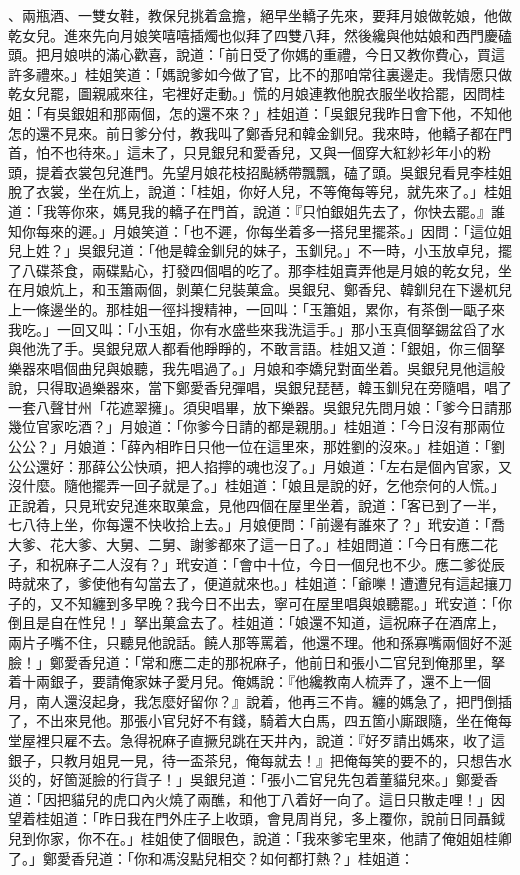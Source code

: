 \begin{showcontents}{}
、兩瓶酒、一雙女鞋，教保兒挑着盒擔，絕早坐轎子先來，要拜月娘做乾娘，他做乾女兒。進來先向月娘笑嘻嘻插燭也似拜了四雙八拜，然後纔與他姑娘和西門慶磕頭。把月娘哄的滿心歡喜，說道：「前日受了你媽的重禮，今日又教你費心，買這許多禮來。」桂姐笑道：「媽說爹如今做了官，比不的那咱常往裏邊走。我情愿只做乾女兒罷，圖親戚來往，宅裡好走動。」慌的月娘連教他脫衣服坐收拾罷，因問桂姐：「有吳銀姐和那兩個，怎的還不來？」桂姐道：「吳銀兒我昨日會下他，不知他怎的還不見來。前日爹分付，教我叫了鄭香兒和韓金釧兒。我來時，他轎子都在門首，怕不也待來。」這未了，只見銀兒和愛香兒，又與一個穿大紅紗衫年小的粉頭，提着衣裳包兒進門。先望月娘花枝招颭綉帶飄飄，磕了頭。吳銀兒看見李桂姐脫了衣裳，坐在炕上，說道：「桂姐，你好人兒，不等俺每等兒，就先來了。」桂姐道：「我等你來，媽見我的轎子在門首，說道：『只怕銀姐先去了，你快去罷。』誰知你每來的遲。」月娘笑道：「也不遲，你每坐着多一搭兒里擺茶。」因問：「這位姐兒上姓？」吳銀兒道：「他是韓金釧兒的妹子，玉釧兒。」不一時，小玉放卓兒，擺了八碟茶食，兩碟點心，打發四個唱的吃了。那李桂姐賣弄他是月娘的乾女兒，坐在月娘炕上，和玉簫兩個，剝菓仁兒裝菓盒。吳銀兒、鄭香兒、韓釧兒在下邊杌兒上一條邊坐的。那桂姐一徑抖搜精神，一回叫：「玉簫姐，累你，有茶倒一甌子來我吃。」一回又叫：「小玉姐，你有水盛些來我洗這手。」那小玉真個拏錫盆舀了水與他洗了手。吳銀兒眾人都看他睜睜的，不敢言語。桂姐又道：「銀姐，你三個拏樂器來唱個曲兒與娘聽，我先唱過了。」月娘和李嬌兒對面坐着。吳銀兒見他這般說，只得取過樂器來，當下鄭愛香兒彈唱，吳銀兒琵琶，韓玉釧兒在旁隨唱，唱了一套八聲甘州「花遮翠擁」。須臾唱畢，放下樂器。吳銀兒先問月娘：「爹今日請那幾位官家吃酒？」月娘道：「你爹今日請的都是親朋。」桂姐道：「今日沒有那兩位公公？」月娘道：「薛內相昨日只他一位在這里來，那姓劉的沒來。」桂姐道：「劉公公還好：那薛公公快頑，把人掐擰的魂也沒了。」月娘道：「左右是個內官家，又沒什麼。隨他擺弄一回子就是了。」桂姐道：「娘且是說的好，乞他奈何的人慌。」正說着，只見玳安兒進來取菓盒，見他四個在屋里坐着，說道：「客已到了一半，七八待上坐，你每還不快收拾上去。」月娘便問：「前邊有誰來了？」玳安道：「喬大爹、花大爹、大舅、二舅、謝爹都來了這一日了。」桂姐問道：「今日有應二花子，和祝麻子二人沒有？」玳安道：「會中十位，今日一個兒也不少。應二爹從辰時就來了，爹使他有勾當去了，便道就來也。」桂姐道：「爺嚛！遭遭兒有這起攘刀子的，又不知纏到多早晚？我今日不出去，寧可在屋里唱與娘聽罷。」玳安道：「你倒且是自在性兒！」拏出菓盒去了。桂姐道：「娘還不知道，這祝麻子在酒席上，兩片子嘴不住，只聽見他說話。饒人那等罵着，他還不理。他和孫寡嘴兩個好不涎臉！」鄭愛香兒道：「常和應二走的那祝麻子，他前日和張小二官兒到俺那里，拏着十兩銀子，要請俺家妹子愛月兒。俺媽說：『他纔教南人梳弄了，還不上一個月，南人還沒起身，我怎麼好留你？』說着，他再三不肯。纏的媽急了，把門倒插了，不出來見他。那張小官兒好不有錢，騎着大白馬，四五箇小廝跟隨，坐在俺每堂屋裡只雇不去。急得祝麻子直撅兒跳在天井內，說道：『好歹請出媽來，收了這銀子，只教月姐見一見，待一盃茶兒，俺每就去！』把俺每笑的要不的，只想告水災的，好箇涎臉的行貨子！」吳銀兒道：「張小二官兒先包着董貓兒來。」鄭愛香道：「因把貓兒的虎口內火燒了兩醮，和他丁八着好一向了。這日只散走哩！」因望着桂姐道：「昨日我在門外庄子上收頭，會見周肖兒，多上覆你，說前日同聶鉞兒到你家，你不在。」桂姐使了個眼色，說道：「我來爹宅里來，他請了俺姐姐桂卿了。」鄭愛香兒道：「你和馮沒點兒相交？如何都打熱？」桂姐道：
\end{showcontents}
